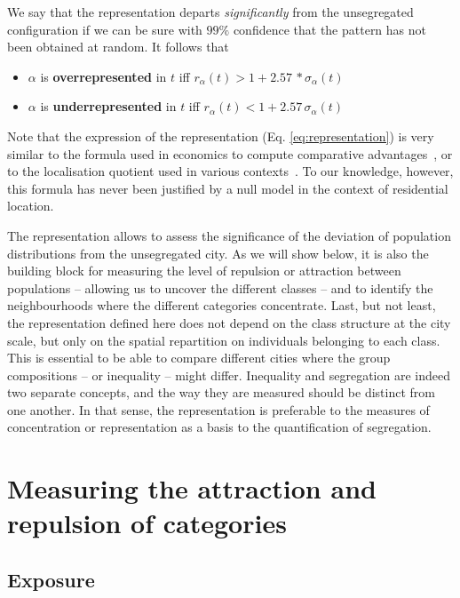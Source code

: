We say that the representation departs \emph{significantly} from the
unsegregated configuration if we can be sure with $99\%$ confidence that the
pattern has not been obtained at random. It follows that

\begin{itemize}
    \item $\alpha$ is {\bf overrepresented} in $t$ iff $r_\alpha(t) > 1 +
  2.57\,*\sigma_\alpha(t)$
    \item $\alpha$ is {\bf underrepresented} in $t$ iff $r_\alpha(t) < 1 +
  2.57\,\sigma_\alpha(t)$
\end{itemize}

Note that the expression of the representation (Eq. \ref{eq:representation}) is very
similar to the formula used in economics to compute comparative
advantages~\cite{Balassa:1965}, or to the localisation quotient used in various
contexts~\cite{Apparicio:2000, Schwabe:2011}. To our knowledge, however, this
formula has never been justified by a null model in the context of residential
location. 

The representation allows to assess the significance of the deviation
of population distributions from the unsegregated city. As we will show below,
it is also the building block for measuring the level of repulsion or attraction
between populations -- allowing us to uncover the different classes -- and to
identify the neighbourhoods where the different categories concentrate. 
Last,
but not least, the representation defined here does not depend on the class
structure at the city scale, but only on the spatial repartition on individuals
belonging to each class. This is essential to be able to compare different
cities where the group compositions -- or inequality -- might differ. Inequality
and segregation are indeed two separate concepts, and the way they are measured should
be distinct from one another. In that sense, the representation is preferable to
the measures of concentration or representation as a basis to the quantification
of segregation.


\section{Measuring the attraction and repulsion of categories}
\label{sec:measuring_the_attraction_and_repulsion_of_categories}

\subsection{Exposure}
\label{sub:exposure}


